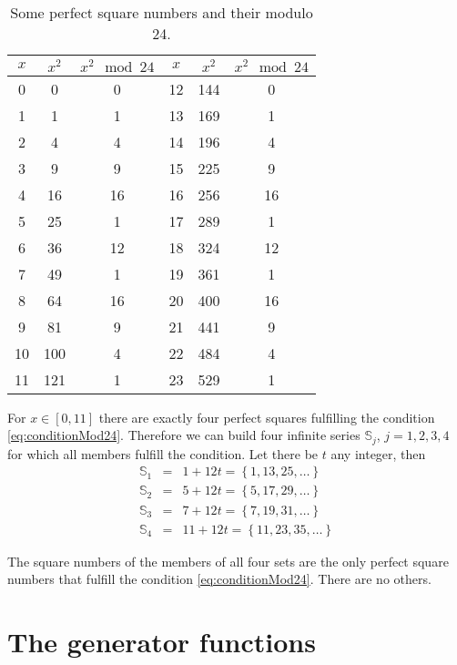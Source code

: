 \documentclass[reqno,10pt,a4paper]{article}
\begin{document}
	\begin{table}
			\begin{tabular}{|c|c|c||c|c|c|}
			\hline
			$x$ & $x^2$ & $x^2 \mod 24$ & $x$ & $x^2$ & $x^2 \mod 24$ \\
			\hline
			0 & 0 & 0 & 12 & 144 & 0 \\
			1 & 1 & 1 & 13 & 169 & 1 \\
			2 & 4 & 4 & 14 & 196 & 4 \\
			3 & 9 & 9 & 15 & 225 & 9 \\
			4 & 16 & 16 & 16 & 256 & 16 \\
			5 & 25 & 1 & 17 & 289 & 1 \\
			6 & 36 & 12 & 18 & 324 & 12 \\
			7 & 49 & 1 & 19 & 361 & 1 \\
			8 & 64 & 16 & 20 & 400 & 16 \\
			9 & 81 & 9 & 21 & 441 & 9 \\
			10 & 100 & 4 & 22 & 484 & 4 \\
			11 & 121 & 1 & 23 & 529 & 1 \\
			\hline
		\end{tabular}
		\caption{Some perfect square numbers and their modulo 24.} \label{perfectSquares}
	\end{table}
	
	For $x \in [0, 11]$ there are exactly four perfect squares fulfilling the condition \eqref{eq:conditionMod24}. Therefore we can build four infinite series $\mathbb{S}_j$, $j = 1, 2, 3, 4$ for which all members fulfill the condition. Let there be $t$ any integer, then
	\begin{eqnarray}
		\mathbb{S}_1 &=& 1 + 12 t = \left\{ 1, 13, 25, \ldots \right\} \\
		\mathbb{S}_2 &=& 5 + 12 t = \left\{ 5, 17, 29, \ldots \right\} \\
		\mathbb{S}_3 &=& 7 + 12 t = \left\{ 7, 19, 31, \ldots \right\} \\
		\mathbb{S}_4 &=& 11 + 12 t = \left\{ 11, 23, 35, \ldots \right\}
	\end{eqnarray}
	
	The square numbers of the members of all four sets are the only perfect square numbers that fulfill the condition \eqref{eq:conditionMod24}. There are no others.
	
	
	\section{The generator functions}
	
\end{document}
